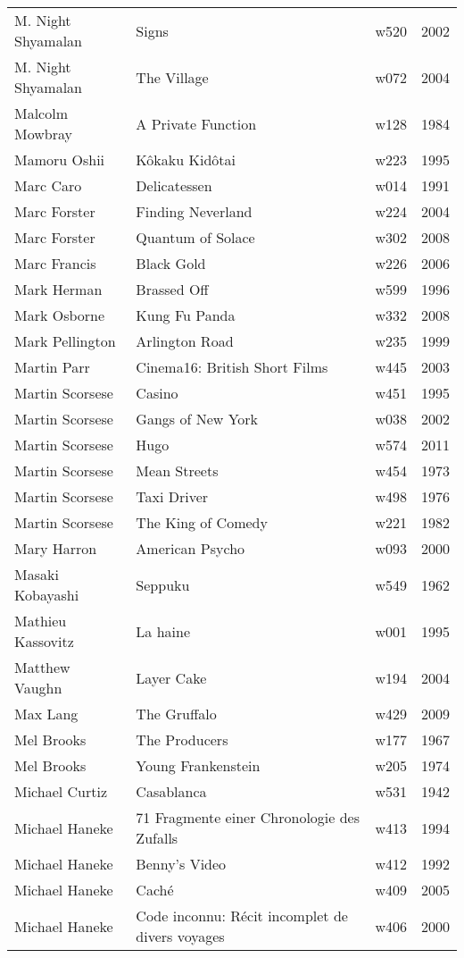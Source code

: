 \documentclass{article}
\begin{document}
\begin {center}
\begin{longtable}{l p{10cm} l l}
M. Night Shyamalan & Signs & w520 & 2002 \\
M. Night Shyamalan & The Village & w072 & 2004 \\
Malcolm Mowbray & A Private Function & w128 & 1984 \\
Mamoru Oshii & Kôkaku Kidôtai & w223 & 1995 \\
Marc Caro & Delicatessen & w014 & 1991 \\
Marc Forster & Finding Neverland & w224 & 2004 \\
Marc Forster & Quantum of Solace & w302 & 2008 \\
Marc Francis & Black Gold & w226 & 2006 \\
Mark Herman & Brassed Off & w599 & 1996 \\
Mark Osborne & Kung Fu Panda & w332 & 2008 \\
Mark Pellington & Arlington Road & w235 & 1999 \\
Martin Parr & Cinema16: British Short Films & w445 & 2003 \\
Martin Scorsese & Casino & w451 & 1995 \\
Martin Scorsese & Gangs of New York & w038 & 2002 \\
Martin Scorsese & Hugo & w574 & 2011 \\
Martin Scorsese & Mean Streets & w454 & 1973 \\
Martin Scorsese & Taxi Driver & w498 & 1976 \\
Martin Scorsese & The King of Comedy & w221 & 1982 \\
Mary Harron & American Psycho & w093 & 2000 \\
Masaki Kobayashi & Seppuku & w549 & 1962 \\
Mathieu Kassovitz & La haine & w001 & 1995 \\
Matthew Vaughn & Layer Cake & w194 & 2004 \\
Max Lang & The Gruffalo & w429 & 2009 \\
Mel Brooks & The Producers & w177 & 1967 \\
Mel Brooks & Young Frankenstein & w205 & 1974 \\
Michael Curtiz & Casablanca & w531 & 1942 \\
Michael Haneke & 71 Fragmente einer Chronologie des Zufalls & w413 & 1994 \\
Michael Haneke & Benny's Video & w412 & 1992 \\
Michael Haneke & Caché & w409 & 2005 \\
Michael Haneke & Code inconnu: Récit incomplet de divers voyages & w406 & 2000 \\

\end{longtable}
\end{center}
\end{document}
